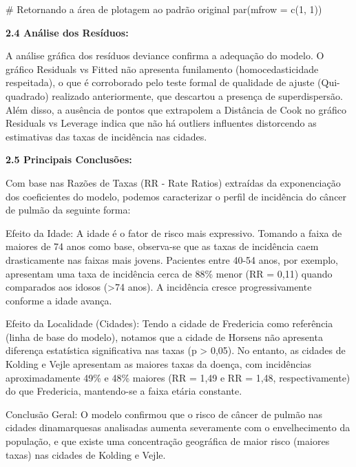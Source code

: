 \documentclass[
  letterpaper,
]{article}
\newenvironment{Shaded}{\begin{snugshade}}{\end{snugshade}}
\newcommand{\AttributeTok}[1]{\textcolor[rgb]{0.40,0.45,0.13}{#1}}
\newcommand{\CommentTok}[1]{\textcolor[rgb]{0.37,0.37,0.37}{#1}}
\newcommand{\DecValTok}[1]{\textcolor[rgb]{0.68,0.00,0.00}{#1}}
\newcommand{\FunctionTok}[1]{\textcolor[rgb]{0.28,0.35,0.67}{#1}}
\newcommand{\NormalTok}[1]{\textcolor[rgb]{0.00,0.23,0.31}{#1}}
\begin{document}
\begin{Shaded}
\begin{Highlighting}[]
\CommentTok{\# Retornando a área de plotagem ao padrão original}
\FunctionTok{par}\NormalTok{(}\AttributeTok{mfrow =} \FunctionTok{c}\NormalTok{(}\DecValTok{1}\NormalTok{, }\DecValTok{1}\NormalTok{))}
\end{Highlighting}
\end{Shaded}

\textbf{2.4 Análise dos Resíduos:}

A análise gráfica dos resíduos deviance confirma a adequação do modelo.
O gráfico Residuals vs Fitted não apresenta funilamento
(homocedasticidade respeitada), o que é corroborado pelo teste formal de
qualidade de ajuste (Qui-quadrado) realizado anteriormente, que
descartou a presença de superdispersão. Além disso, a ausência de pontos
que extrapolem a Distância de Cook no gráfico Residuals vs Leverage
indica que não há outliers influentes distorcendo as estimativas das
taxas de incidência nas cidades.

\textbf{2.5 Principais Conclusões:}

Com base nas Razões de Taxas (RR - Rate Ratios) extraídas da
exponenciação dos coeficientes do modelo, podemos caracterizar o perfil
de incidência do câncer de pulmão da seguinte forma:

Efeito da Idade: A idade é o fator de risco mais expressivo. Tomando a
faixa de maiores de 74 anos como base, observa-se que as taxas de
incidência caem drasticamente nas faixas mais jovens. Pacientes entre
40-54 anos, por exemplo, apresentam uma taxa de incidência cerca de 88\%
menor (RR = 0,11) quando comparados aos idosos (\textgreater74 anos). A
incidência cresce progressivamente conforme a idade avança.

Efeito da Localidade (Cidades): Tendo a cidade de Fredericia como
referência (linha de base do modelo), notamos que a cidade de Horsens
não apresenta diferença estatística significativa nas taxas (p
\textgreater{} 0,05). No entanto, as cidades de Kolding e Vejle
apresentam as maiores taxas da doença, com incidências aproximadamente
49\% e 48\% maiores (RR = 1,49 e RR = 1,48, respectivamente) do que
Fredericia, mantendo-se a faixa etária constante.

Conclusão Geral: O modelo confirmou que o risco de câncer de pulmão nas
cidades dinamarquesas analisadas aumenta severamente com o
envelhecimento da população, e que existe uma concentração geográfica de
maior risco (maiores taxas) nas cidades de Kolding e Vejle.
\end{document}
